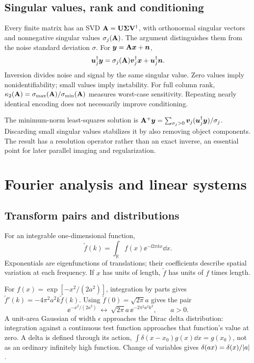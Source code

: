 \subsection{Singular values, rank and conditioning}
Every finite matrix has an SVD
$\mathbf{A}=\mathbf{U}\mathbf{\Sigma}\mathbf{V}^{\dagger}$, with orthonormal singular vectors
and nonnegative singular values $\sigma_j(\mathbf{A})$.
The argument distinguishes them from the noise standard deviation $\sigma$.
For $\bm{y}=\mathbf{A}\bm{x}+\bm{n}$,
\[
 \bm{u}_j^{\dagger}\bm{y}=\sigma_j(\mathbf{A})\bm{v}_j^{\dagger}\bm{x}+
                         \bm{u}_j^{\dagger}\bm{n} .
\]
Inversion divides noise and signal by the same singular value.
Zero values imply nonidentifiability; small values imply instability.
For full column rank,
$\kappa_2(\mathbf{A})=\sigma_{\max}(\mathbf{A})/\sigma_{\min}(\mathbf{A})$
measures worst-case sensitivity. Repeating nearly identical encoding
does not necessarily improve conditioning.

The minimum-norm least-squares solution is
$\mathbf{A}^+\bm{y}=\sum_{\sigma_j>0}
\bm{v}_j(\bm{u}_j^{\dagger}\bm{y})/\sigma_j$.
Discarding small singular values stabilizes it by also removing object
components. The result has a resolution operator rather than an exact
inverse, an essential point for later parallel imaging and regularization.

\section{Fourier analysis and linear systems}
\label{sec:01:fourier-analysis-and-linear-systems}
\subsection{Transform pairs and distributions}
For an integrable one-dimensional function,
\begin{equation}
 \widetilde f(k)=\int_{\mathbb R}f(x)\ee^{-\ii2\pi kx}\dd x .
 \label{eq:01:ft}
\end{equation}
Exponentials are eigenfunctions of translations; their coefficients
describe spatial variation at each frequency. If $x$ has units of length,
$\widetilde f$ has units of $f$ times length.

For $f(x)=\exp[-x^2/(2a^2)]$, integration by parts gives
$\widetilde f'(k)=-4\pi^2a^2k\widetilde f(k)$.
Using $\widetilde f(0)=\sqrt{2\pi}a$ gives the pair
\begin{equation}
 \ee^{-x^2/(2a^2)}
 \ \longleftrightarrow\
 \sqrt{2\pi}a\,\ee^{-2\pi^2a^2k^2},\qquad a>0 .
 \label{eq:01:gaussian}
\end{equation}
A unit-area Gaussian of width $\epsilon$ approaches the Dirac delta
distribution: integration against a continuous test function approaches
that function's value at zero. A delta is defined through its action,
$\int\delta(x-x_0)g(x)\dd x=g(x_0)$, not as an ordinary infinitely
high function. Change of variables gives $\delta(ax)=\delta(x)/\lvert a\rvert$.

